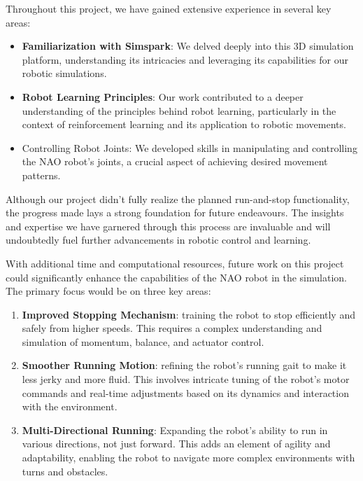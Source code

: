\documentclass[conference]{IEEEtran}
\begin{document}
Throughout this project, we have gained extensive experience in several key areas:

\begin{itemize}
    \item \textbf{Familiarization with Simspark}: We delved deeply into this 3D simulation platform, understanding its intricacies and leveraging its capabilities for our robotic simulations.
   \item \textbf{Robot Learning Principles}: Our work contributed to a deeper understanding of the principles behind robot learning, particularly in the context of reinforcement learning and its application to robotic movements.
   \item{Controlling Robot Joints: We developed skills in manipulating and controlling the NAO robot's joints, a crucial aspect of achieving desired movement patterns.}
\end{itemize}

Although our project didn't fully realize the planned run-and-stop functionality, the progress made lays a strong foundation for future endeavours. The insights and expertise we have garnered through this process are invaluable and will undoubtedly fuel further advancements in robotic control and learning.

With additional time and computational resources, future work on this project could significantly enhance the capabilities of the NAO robot in the simulation. The primary focus would be on three key areas:

\begin{enumerate}
    \item \textbf{Improved Stopping Mechanism}: training the robot to stop efficiently and safely from higher speeds. This requires a complex understanding and simulation of momentum, balance, and actuator control.
    \item \textbf{Smoother Running Motion}: refining the robot's running gait to make it less jerky and more fluid. This involves intricate tuning of the robot's motor commands and real-time adjustments based on its dynamics and interaction with the environment.
    \item \textbf{Multi-Directional Running}: Expanding the robot's ability to run in various directions, not just forward. This adds an element of agility and adaptability, enabling the robot to navigate more complex environments with turns and obstacles.
\end{enumerate}
\end{document}
